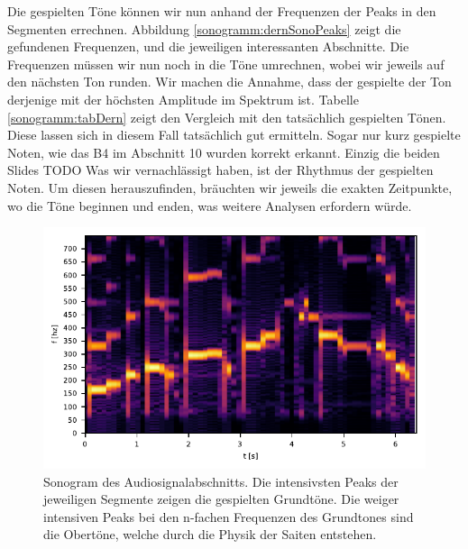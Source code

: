 Die gespielten Töne können wir nun anhand der Frequenzen 
der Peaks in den Segmenten errechnen.
Abbildung \ref{sonogramm:dernSonoPeaks} zeigt die gefundenen Frequenzen, und die
jeweiligen interessanten Abschnitte.
Die Frequenzen müssen wir nun noch in die Töne umrechnen, wobei wir jeweils auf den
nächsten Ton runden.
Wir machen die Annahme, dass der gespielte der Ton derjenige mit der höchsten Amplitude im Spektrum 
ist. 
Tabelle \ref{sonogramm:tabDern} zeigt den Vergleich mit den tatsächlich gespielten Tönen.
Diese lassen sich in diesem Fall tatsächlich gut ermitteln.
Sogar nur kurz gespielte Noten, wie das B4 im Abschnitt 10 
wurden korrekt erkannt.
Einzig die beiden Slides TODO
Was wir vernachlässigt haben, ist der Rhythmus der gespielten Noten.
Um diesen herauszufinden, bräuchten wir jeweils die exakten Zeitpunkte, wo die Töne
beginnen und enden, was weitere Analysen erfordern würde.

\begin{figure}
    \centering
    \includegraphics{papers/sonogramm/images/dernSono1.pdf}
    \caption{Sonogram des Audiosignalabschnitts. Die intensivsten Peaks der 
    jeweiligen Segmente zeigen die gespielten Grundtöne. Die weiger
    intensiven Peaks bei den n-fachen Frequenzen des Grundtones sind die Obertöne, welche durch die Physik der Saiten 
    entstehen.
    \label{sonogramm:dernSono}
    }
\end{figure}

